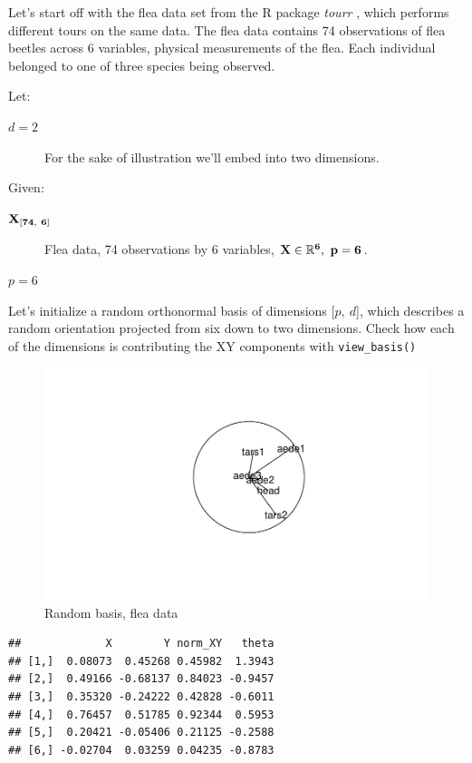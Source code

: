 \documentclass{monashthesis}
\begin{document}
Let's start off with the flea data set from the R package \emph{tourr}
\autocite{wickham_tourr_2011}, which performs different tours on the
same data. The flea data contains 74 observations of flea beetles across
6 variables, physical measurements of the flea. Each individual belonged
to one of three species being observed.

Let:

\begin{description}
  \item[$d=2$] For the sake of illustration we'll embed into two dimensions.
\end{description}

Given:

\begin{description}
  \item[$\bf{X}_{[74,~6]}$] Flea data, 74 observations by 6 variables, $\bf{X} \in \mathbb{R}^6, ~p=6$.
  \item[$p=6$]
\end{description}

Let's initialize a random orthonormal basis of dimensions
{[}\(p,~d\){]}, which describes a random orientation projected from six
down to two dimensions. Check how each of the dimensions is contributing
the XY components with \texttt{view\_basis()}

\begin{figure}
\centering
\includegraphics{thesis_files/figure-latex/unnamed-chunk-1-1.pdf}
\caption{\label{fig:unnamed-chunk-1}Random basis, flea data}
\end{figure}

\begin{verbatim}
##             X        Y norm_XY   theta
## [1,]  0.08073  0.45268 0.45982  1.3943
## [2,]  0.49166 -0.68137 0.84023 -0.9457
## [3,]  0.35320 -0.24222 0.42828 -0.6011
## [4,]  0.76457  0.51785 0.92344  0.5953
## [5,]  0.20421 -0.05406 0.21125 -0.2588
## [6,] -0.02704  0.03259 0.04235 -0.8783
\end{verbatim}
\end{document}
